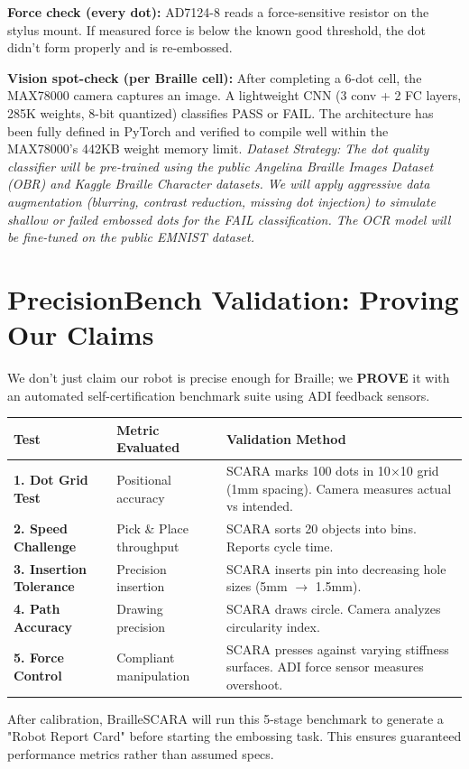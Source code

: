 \documentclass[11pt,a4paper]{article}
\begin{document}
\textbf{Force check (every dot):} AD7124-8 reads a force-sensitive resistor on the stylus mount. If measured force is below the known good threshold, the dot didn't form properly and is re-embossed.

\textbf{Vision spot-check (per Braille cell):} After completing a 6-dot cell, the MAX78000 camera captures an image. A lightweight CNN (3 conv + 2 FC layers, 285K weights, 8-bit quantized) classifies PASS or FAIL. The architecture has been fully defined in PyTorch and verified to compile well within the MAX78000's 442KB weight memory limit. \textit{Dataset Strategy: The dot quality classifier will be pre-trained using the public Angelina Braille Images Dataset (OBR) and Kaggle Braille Character datasets. We will apply aggressive data augmentation (blurring, contrast reduction, missing dot injection) to simulate shallow or failed embossed dots for the FAIL classification. The OCR model will be fine-tuned on the public EMNIST dataset.}

\section{PrecisionBench Validation: Proving Our Claims}
We don't just claim our robot is precise enough for Braille; we \textbf{PROVE} it with an automated self-certification benchmark suite using ADI feedback sensors.

\begin{table}[H]
\centering
\begin{tabularx}{\textwidth}{llX}
\toprule
\textbf{Test} & \textbf{Metric Evaluated} & \textbf{Validation Method} \\
\midrule
\textbf{1. Dot Grid Test} & Positional accuracy & SCARA marks 100 dots in 10$\times$10 grid (1mm spacing). Camera measures actual vs intended. \\
\textbf{2. Speed Challenge} & Pick \& Place throughput & SCARA sorts 20 objects into bins. Reports cycle time. \\
\textbf{3. Insertion Tolerance} & Precision insertion & SCARA inserts pin into decreasing hole sizes (5mm $\rightarrow$ 1.5mm). \\
\textbf{4. Path Accuracy} & Drawing precision & SCARA draws circle. Camera analyzes circularity index. \\
\textbf{5. Force Control} & Compliant manipulation & SCARA presses against varying stiffness surfaces. ADI force sensor measures overshoot. \\
\bottomrule
\end{tabularx}
\end{table}
After calibration, BrailleSCARA will run this 5-stage benchmark to generate a "Robot Report Card" before starting the embossing task. This ensures guaranteed performance metrics rather than assumed specs.
\end{document}
